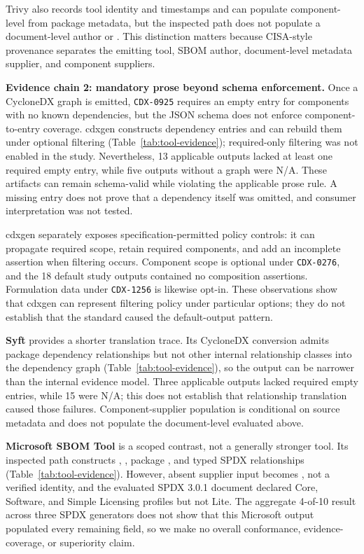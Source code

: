 Trivy also records tool identity and timestamps and can populate component-level  from package metadata, but the inspected path does not populate a document-level author or . This distinction matters because CISA-style provenance separates the emitting tool, SBOM author, document-level metadata supplier, and component suppliers.

\textbf{Evidence chain 2: mandatory prose beyond schema enforcement.} Once a CycloneDX graph is emitted, \texttt{CDX-0925} requires an empty  entry for components with no known dependencies, but the JSON schema does not enforce component-to-entry coverage. cdxgen constructs dependency entries and can rebuild them under optional filtering (Table~\ref{tab:tool-evidence}); required-only filtering was not enabled in the study. Nevertheless, 13 applicable outputs lacked at least one required empty entry, while five outputs without a graph were N/A. These artifacts can remain schema-valid while violating the applicable prose rule. A missing entry does not prove that a dependency itself was omitted, and consumer interpretation was not tested.

cdxgen separately exposes specification-permitted policy controls: it can propagate required scope, retain required components, and add an incomplete  assertion when filtering occurs. Component scope is optional under \texttt{CDX-0276}, and the 18 default study outputs contained no composition assertions. Formulation data under \texttt{CDX-1256} is likewise opt-in. These observations show that cdxgen can represent filtering policy under particular options; they do not establish that the standard caused the default-output pattern.

\textbf{Syft} provides a shorter translation trace. Its CycloneDX conversion admits package dependency relationships but not other internal relationship classes into the dependency graph (Table~\ref{tab:tool-evidence}), so the output can be narrower than the internal evidence model. Three applicable outputs lacked required empty entries, while 15 were N/A; this does not establish that relationship translation caused those failures. Component-supplier population is conditional on source metadata and does not populate the document-level  evaluated above.

\textbf{Microsoft SBOM Tool} is a scoped contrast, not a generally stronger tool. Its inspected path constructs , , package , and typed SPDX relationships (Table~\ref{tab:tool-evidence}). However, absent supplier input becomes , not a verified identity, and the evaluated SPDX 3.0.1 document declared Core, Software, and Simple Licensing profiles but not Lite. The aggregate 4-of-10 result across three SPDX generators does not show that this Microsoft output populated every remaining field, so we make no overall conformance, evidence-coverage, or superiority claim.

